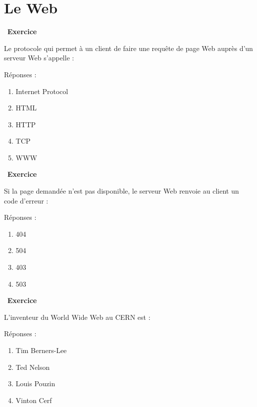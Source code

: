 \documentclass[
  11pt,
]{article}
\providecommand{\tightlist}{%
  \setlength{\itemsep}{0pt}\setlength{\parskip}{0pt}}
\newcounter{exo}
\newenvironment{exercice}[1]
{\par \medskip   \addtocounter{exo}{1} \noindent  
\begin{bclogo}[arrondi =0.1,   noborder = true, logo=\bccrayon, marge=4]{~\textbf{Exercice} \textbf{\theexo} {\itshape #1} }  \par}
{
\end{bclogo}
 \par \bigskip }
\newcounter{def}
\begin{document}
\hypertarget{le-web}{%
\section{Le Web}\label{le-web}}

\begin{exercice}{}

Le protocole qui permet à un client de faire une requête de page Web
auprès d'un serveur Web s'appelle :

Réponses :

\begin{enumerate}
\def\labelenumi{\arabic{enumi}.}
\tightlist
\item
  Internet Protocol
\item
  HTML
\item
  HTTP
\item
  TCP
\item
  WWW
\end{enumerate}

\end{exercice}

\begin{exercice}{}

Si la page demandée n'est pas disponible, le serveur Web renvoie au
client un code d'erreur :

Réponses :

\begin{enumerate}
\def\labelenumi{\arabic{enumi}.}
\item
  404
\item
  504
\item
  403
\item
  503
\end{enumerate}

\end{exercice}

\begin{exercice}{}

L'inventeur du World Wide Web au CERN est :

Réponses :

\begin{enumerate}
\def\labelenumi{\arabic{enumi}.}
\item
  Tim Berners-Lee
\item
  Ted Nelson
\item
  Louis Pouzin
\item
  Vinton Cerf
\end{enumerate}

\end{exercice}
\end{document}
